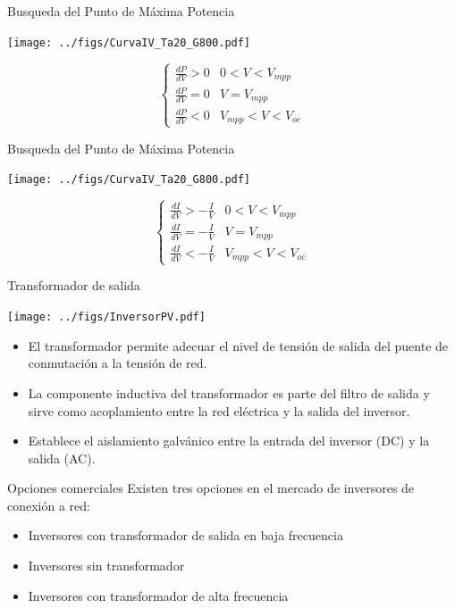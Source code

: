 \documentclass[aspectratio=169, usenames,svgnames,dvipsnames]{beamer}
\begin{document}
\begin{frame}[label={sec:orgdf65389}]{Busqueda del Punto de Máxima Potencia}
\begin{center}
\texttt{[image: ../figs/CurvaIV\_Ta20\_G800.pdf]}
\end{center}

$$\begin{cases}
      \frac{dP}{dV}>0 & 0<V<V_{mpp}\\
      \frac{dP}{dV}=0 & V=V_{mpp}\\
      \frac{dP}{dV}<0 & V_{mpp}<V<V_{oc}\end{cases}$$
\end{frame}

\begin{frame}[label={sec:org3d5065f}]{Busqueda del Punto de Máxima Potencia}
\begin{center}
\texttt{[image: ../figs/CurvaIV\_Ta20\_G800.pdf]}
\end{center}

$$\begin{cases}
      \frac{dI}{dV}>-\frac{I}{V} & 0<V<V_{mpp}\\
      \frac{dI}{dV}=-\frac{I}{V} & V=V_{mpp}\\
      \frac{dI}{dV}<-\frac{I}{V} & V_{mpp}<V<V_{oc}\end{cases}$$
\end{frame}

\begin{frame}[label={sec:orga40718f}]{Transformador de salida}
\begin{center}
\texttt{[image: ../figs/InversorPV.pdf]}
\end{center}

\begin{itemize}
\item El transformador permite adecuar el nivel de tensión de salida del
puente de conmutación a la tensión de red.

\item La componente inductiva del transformador es parte del filtro de
salida y sirve como acoplamiento entre la red eléctrica y la salida
del inversor.

\item Establece el aislamiento galvánico entre la entrada del inversor (DC)
y la salida (AC).
\end{itemize}
\end{frame}

\begin{frame}[label={sec:org6ae274d}]{Opciones comerciales}
Existen tres opciones en el mercado de inversores de conexión a red:

\begin{itemize}
\item Inversores con transformador de salida en baja frecuencia

\item Inversores sin transformador

\item Inversores con transformador de alta frecuencia
\end{itemize}
\end{frame}
\end{document}
